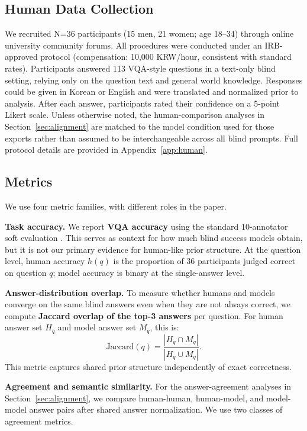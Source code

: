 \documentclass[letterpaper]{article}
\begin{document}
\subsection{Human Data Collection}

We recruited N=36 participants (15 men, 21 women; age 18--34) through online
university community forums. All procedures were conducted under an
IRB-approved protocol (compensation: 10,000 KRW/hour, consistent with
standard rates). Participants answered 113 VQA-style questions in a text-only
blind setting, relying only on the question text and general world knowledge.
Responses could be given in Korean or English and were translated and normalized
prior to analysis. After each answer, participants rated their confidence on a
5-point Likert scale. Unless otherwise noted, the human-comparison analyses in
Section~\ref{sec:alignment} are matched to the model condition used for those
exports rather than assumed to be interchangeable across all blind prompts.
Full protocol details are provided in Appendix~\ref{app:human}.

\subsection{Metrics}

We use four metric families, with different roles in the paper.

\textbf{Task accuracy.}
We report \textbf{VQA accuracy} using the standard 10-annotator soft evaluation
\citep{antol2015vqa}. This serves as context for how much blind success models
obtain, but it is not our primary evidence for human-like prior structure.
At the question level, human accuracy $h(q)$ is the proportion of 36
participants judged correct on question $q$; model accuracy is binary at the
single-answer level.

\textbf{Answer-distribution overlap.}
To measure whether humans and models converge on the same blind answers even
when they are not always correct, we compute \textbf{Jaccard overlap of the
top-3 answers} per question. For human answer set $H_q$ and model answer set
$M_q$, this is:
\[
\mathrm{Jaccard}(q) = \frac{|H_q \cap M_q|}{|H_q \cup M_q|}.
\]
This metric captures shared prior structure independently of exact correctness.

\textbf{Agreement and semantic similarity.}
For the answer-agreement analyses in Section~\ref{sec:alignment}, we compare
human-human, human-model, and model-model answer pairs after shared answer
normalization. We use two classes of agreement metrics.
\end{document}

